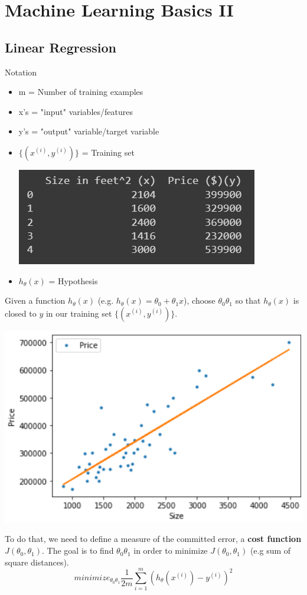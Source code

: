 \chapter{Machine Learning Basics II}
\section{Linear Regression}
Notation
\begin{itemize}
    \item m = Number of training examples
    \item x's = "input" variables/features
    \item y's = "output" variable/target variable
    \item $\{(x^{(i)},y^{(i)})\}$ = Training set
    \begin{flushleft}
        \includegraphics[scale = 0.7]{images/Training set.png}
    \end{flushleft}
    \item $h_{\theta}(x)$ = Hypothesis
\end{itemize}
Given a function $h_{\theta}(x)$ (e.g. $h_{\theta}(x) = \theta_{0} + \theta_{1}x$), choose $\theta_{0} \theta_{1}$ so that $h_{\theta}(x)$ is closed to $y$ in our training set $\{(x^{(i)},y^{(i)})\}$.
\begin{center}
    \includegraphics{images/Linear Ref.png}
\end{center}
To do that, we need to define a measure of the committed error, a \textbf{cost function} $J(\theta_{0},\theta_{1})$.
The goal is to find $\theta_{0} \theta_{1}$ in order to minimize $J(\theta_{0},\theta_{1})$ (e.g sum of square distances).
\[minimize_{\theta_{0} \theta_{1}}\frac{1}{2m}\sum_{i = 1}^{m}(h_{\theta}(x^{(i)}) - y^{(i)})^{2}\]


